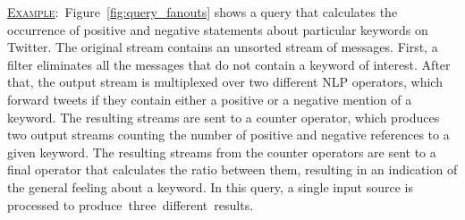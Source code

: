 \underline{\textsc{Example}}:~Figure~\ref{fig:query_fanouts} shows a query that calculates the occurrence
of positive and negative statements about particular keywords on Twitter. 
The original stream contains an unsorted stream of messages. First, a filter eliminates all the
messages that do not contain a keyword of interest. After that, the output stream is multiplexed over
two different NLP operators, which forward tweets if they contain
either a positive or a negative mention of a keyword. The resulting streams are sent to a counter
operator, which produces two output streams counting the number of positive and negative references to
a given keyword. The resulting streams from the counter operators are sent to a final operator that
calculates the ratio between them, resulting in an indication of the general feeling about a
keyword. In this query, a single input source is processed to produce~three~different~results.

 
